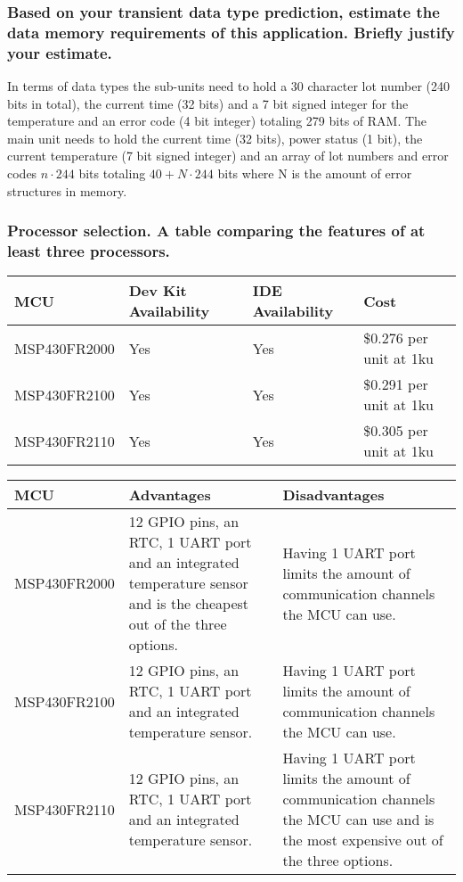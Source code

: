 \documentclass[12pt]{article} \usepackage{jeep} \usepackage{unicode}
\begin{document}
\subsubsection{Based on your transient data type prediction, estimate the data
  memory requirements of this application. Briefly justify your estimate.}
In terms of data types the sub-units need to hold a 30 character lot number (240
bits in total), the current time (32 bits) and a 7 bit signed integer for the
temperature and an error code (4 bit integer) totaling 279 bits of RAM. The main
unit needs to hold the current time (32 bits), power status (1 bit), the current
temperature (7 bit signed integer) and an array of lot numbers and
error codes $n\cdot244$ bits totaling $40 + N\cdot244$ bits where N is the amount of error structures in memory. \vspace{\baselineskip}\\
\subsubsection{Processor selection. A table comparing the features of at least
  three processors.}
\begin{center}
  \begin{tabularx}{\textwidth}{|X|X|X|X|}
    \hline
    MCU & Dev Kit Availability & IDE Availability & Cost\\
    \hline
    MSP430FR2000 & Yes & Yes & \$0.276 per unit at 1ku\\
    \hline
    MSP430FR2100 & Yes & Yes & \$0.291 per unit at 1ku\\
    \hline
    MSP430FR2110 & Yes & Yes & \$0.305 per unit at 1ku\\
    \hline
  \end{tabularx}
  \begin{center}
    \begin{tabularx}{\textwidth}{|X|X|X|}
      \hline
      MCU & Advantages & Disadvantages\\
      \hline
      MSP430FR2000 & 12 GPIO pins, an RTC, 1 UART port and an integrated temperature sensor and is the cheapest out of the three options. & Having 1 UART port limits the amount of communication channels the MCU can use. \\
      \hline
      MSP430FR2100 & 12 GPIO pins, an RTC, 1 UART port and an integrated temperature sensor. & Having 1 UART port limits the amount of communication channels the MCU can use. \\
      \hline
      MSP430FR2110 & 12 GPIO pins, an RTC, 1 UART port and an integrated temperature sensor. & Having 1 UART port limits the amount of communication channels the MCU can use and is the most expensive out of the three options. \\
      \hline
    \end{tabularx}
  \end{center}
\end{center}
\end{document}
